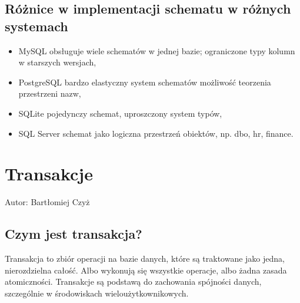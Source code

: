 \documentclass[a4paper,11pt,polish]{sphinxmanual}
\begin{document}
\subsection{Różnice w implementacji schematu w różnych systemach}
\label{\detokenize{Kontrola_i_konserwacja/kontrola_i_konserwacja:roznice-w-implementacji-schematu-w-roznych-systemach}}\begin{itemize}
\item {} 
\sphinxAtStartPar
MySQL \sphinxhyphen{} obsługuje wiele schematów w jednej bazie; ograniczone typy kolumn w starszych wersjach,

\item {} 
\sphinxAtStartPar
PostgreSQL \sphinxhyphen{} bardzo elastyczny system schematów \sphinxhyphen{} możliwość teorzenia przestrzeni nazw,

\item {} 
\sphinxAtStartPar
SQLite \sphinxhyphen{} pojedynczy schemat, uproszczony system typów,

\item {} 
\sphinxAtStartPar
SQL Server \sphinxhyphen{} schemat jako logiczna przestrzeń obiektów, np. dbo, hr, finance.

\end{itemize}


\section{Transakcje}
\label{\detokenize{Kontrola_i_konserwacja/kontrola_i_konserwacja:transakcje}}
\sphinxAtStartPar
Autor: Bartłomiej Czyż


\subsection{Czym jest transakcja?}
\label{\detokenize{Kontrola_i_konserwacja/kontrola_i_konserwacja:czym-jest-transakcja}}
\sphinxAtStartPar
Transakcja to zbiór operacji na bazie danych, które są traktowane jako jedna, nierozdzielna całość. Albo wykonują się wszystkie operacje, albo żadna \sphinxhyphen{} zasada atomiczności. Transakcje są podstawą do zachowania spójności danych, szczególnie w środowiskach wieloużytkownikowych.
\end{document}
